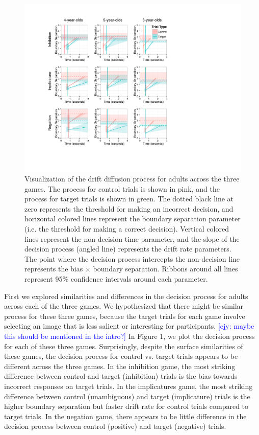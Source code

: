 \documentclass[10pt,letterpaper]{article}
\newcommand{\ejy}[1]{\textcolor{Blue}{[ejy: #1]}}  %
\begin{document}
\begin{figure}
\begin{center} 
\includegraphics[width=6in]{figures/adult_vis.pdf}
\caption{\label{fig:adults} Visualization of the drift diffusion process for adults across the three games.  The process for control trials is shown in pink, and the process for target trials is shown in green.  The dotted black line at zero represents the threshold for making an incorrect decision, and horizontal colored lines represent the boundary separation parameter (i.e. the threshold for making a correct decision).  Vertical colored lines represent the non-decision time parameter, and the slope of the decision process (angled line) represents the drift rate parameters.  The point where the decision process intercepts the non-decision line represents the bias $\times$ boundary separation.  Ribbons around all lines represent 95\% confidence intervals around each parameter.}
\end{center} 
\end{figure}

First we explored similarities and differences in the decision process for adults across each of the three games.  We hypothesized that there might be similar process for these three games, because the target trials for each game involve selecting an image that is less salient or interesting for participants. \ejy{maybe this should be mentioned in the intro?} In Figure 1, we plot the decision process for each of these three games.  Surprisingly, despite the surface similarities of these games, the decision process for control vs. target trials appears to be different across the three games.  In the inhibition game, the most striking difference between control and target (inhibition) trials is the bias towards incorrect responses on target trials.  In the implicatures game, the most striking difference between control (unambiguous) and target (implicature) trials is the higher boundary separation but faster drift rate for control trials compared to target trials.  In the negation game, there appears to be little difference in the decision process between control (positive) and target (negative) trials.
\end{document}
